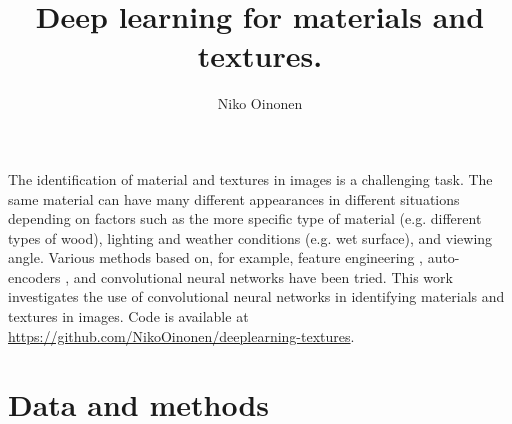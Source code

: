 \documentclass[12pt,a4paper]{article}
\begin{document}
	
	\title{Deep learning for materials and textures.}
	\author{Niko Oinonen}
	\maketitle
	
	\noindent
	The identification of material and textures in images is a challenging task. The same material can have many different appearances in different situations depending on factors such as the more specific type of material (e.g. different types of wood), lighting and weather conditions (e.g. wet surface), and viewing angle. Various methods based on, for example, feature engineering \cite{liu_2010}, auto-encoders \cite{li_2014}, and convolutional neural networks \cite{kalliatakis_2016} have been tried. This work investigates the use of convolutional neural networks in identifying materials and textures in images. Code is available at \url{https://github.com/NikoOinonen/deeplearning-textures}.
	
	\section{Data and methods}
	
\end{document}
